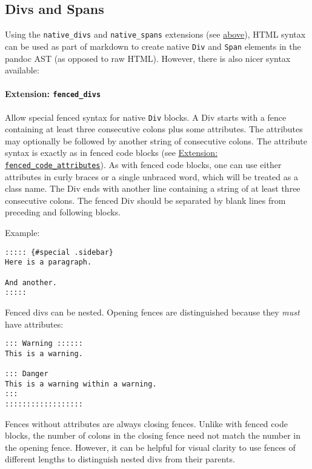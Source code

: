 \documentclass[
]{article}
\begin{document}
\subsection{Divs and Spans}\label{divs-and-spans}

Using the \texttt{native\_divs} and \texttt{native\_spans} extensions
(see \hyperref[extension-native_divs]{above}), HTML syntax can be used
as part of markdown to create native \texttt{Div} and \texttt{Span}
elements in the pandoc AST (as opposed to raw HTML). However, there is
also nicer syntax available:

\paragraph{\texorpdfstring{Extension:
\texttt{fenced\_divs}}{Extension: fenced\_divs}}\label{extension-fenced_divs}

Allow special fenced syntax for native \texttt{Div} blocks. A Div starts
with a fence containing at least three consecutive colons plus some
attributes. The attributes may optionally be followed by another string
of consecutive colons. The attribute syntax is exactly as in fenced code
blocks (see \hyperref[extension-fenced_code_attributes]{Extension:
\texttt{fenced\_code\_attributes}}). As with fenced code blocks, one can
use either attributes in curly braces or a single unbraced word, which
will be treated as a class name. The Div ends with another line
containing a string of at least three consecutive colons. The fenced Div
should be separated by blank lines from preceding and following blocks.

Example:

\begin{verbatim}
::::: {#special .sidebar}
Here is a paragraph.

And another.
:::::
\end{verbatim}

Fenced divs can be nested. Opening fences are distinguished because they
\emph{must} have attributes:

\begin{verbatim}
::: Warning ::::::
This is a warning.

::: Danger
This is a warning within a warning.
:::
::::::::::::::::::
\end{verbatim}

Fences without attributes are always closing fences. Unlike with fenced
code blocks, the number of colons in the closing fence need not match
the number in the opening fence. However, it can be helpful for visual
clarity to use fences of different lengths to distinguish nested divs
from their parents.
\end{document}
